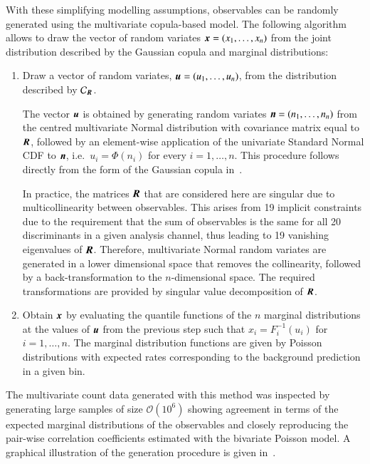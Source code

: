 With these simplifying modelling assumptions, observables can be
randomly generated using the multivariate copula-based model. The
following algorithm allows to draw the vector of random variates
$\myvec{x} = (x_1, \dots, x_n)$ from the joint distribution described
by the Gaussian copula and marginal distributions:
\begin{enumerate}
\item Draw a vector of random variates,
  $\myvec{u} = (u_1, \dots, u_n)$, from the distribution described by
  $\mathcal{C}_{\myvec{R}}$.

  The vector $\myvec{u}$ is obtained by generating random variates
  $\myvec{n} = (n_1, \dots, n_n)$ from the centred multivariate
  Normal distribution with covariance matrix equal to $\myvec{R}$,
  followed by an element-wise application of the univariate Standard
  Normal CDF to $\myvec{n}$, i.e.\ $u_i = \Phi(n_i)$ for every
  $i = 1, \dots, n$. This procedure follows directly from the form of
  the Gaussian copula in~.

  In practice, the matrices $\myvec{R}$ that are considered here are
  singular due to multicollinearity between observables. This arises
  from 19 implicit constraints due to the requirement that the sum of
  observables is the same for all 20 discriminants in a given analysis
  channel, thus leading to 19 vanishing eigenvalues of
  $\myvec{R}$. Therefore, multivariate Normal random variates are
  generated in a lower dimensional space that removes the
  collinearity, followed by a back-transformation to the
  $n$-dimensional space. The required transformations are provided by
  singular value decomposition of $\myvec{R}$.

\item Obtain $\myvec{x}$ by evaluating the quantile functions of the
  $n$ marginal distributions at the values of $\myvec{u}$ from the
  previous step such that $x_i = F_{i}^{-1}(u_i)$ for
  $i = 1, \dots, n$. The marginal distribution functions are given by
  Poisson distributions with expected rates corresponding to the
  background prediction in a given bin.
\end{enumerate}
The multivariate count data generated with this method was inspected
by generating large samples of size $\mathcal{O}(10^6)$ showing
agreement in terms of the expected marginal distributions of the
observables and closely reproducing the pair-wise correlation
coefficients estimated with the bivariate Poisson model. A graphical
illustration of the generation procedure is given
in~.


